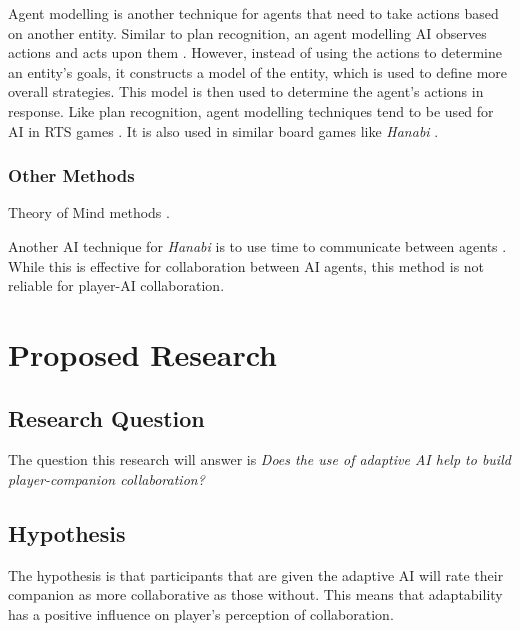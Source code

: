 \documentclass{IEEEtran}
\begin{document}
Agent modelling is another technique for agents that need to take actions based on another entity. Similar to plan recognition, an agent modelling AI observes actions and acts upon them \cite{yannakakis2013playermodelling}. However, instead of using the actions to determine an entity’s goals, it constructs a model of the entity, which is used to define more overall strategies. This model is then used to determine the agent's actions in response. Like plan recognition, agent modelling techniques tend to be used for AI in RTS games \cite{OpponentModellingRTS2007, bakkes2009opponentmodelling}. It is also used in similar board games like \textit{Hanabi} \cite{EvaluatingHanabiAgents}.

\subsubsection{Other Methods}
\label{OtherConsiderations}

Theory of Mind methods \cite{TheoryOfMind2013, von2017mindsofmany}.

Another AI technique for \textit{Hanabi} is to use time to communicate between agents \cite{WaitASecond2019}. While this is effective for collaboration between AI agents, this method is not reliable for player-AI collaboration.

\section{Proposed Research}
\label{ProposedResearch}

\subsection{Research Question}
\label{ResearchQuestion}

The question this research will answer is \textit{Does the use of adaptive AI help to build player-companion collaboration?}

\subsection{Hypothesis}
\label{Hypotheses}
The hypothesis is that participants that are given the adaptive AI will rate their companion as more collaborative as those without. This means that adaptability has a positive influence on player’s perception of collaboration.
\end{document}
